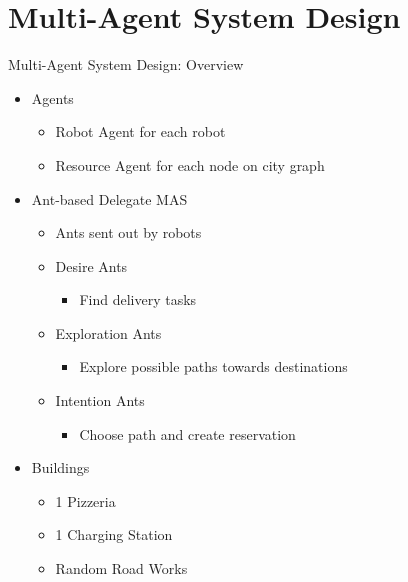 \section{Multi-Agent System Design}

\begin{frame}{Multi-Agent System Design: Overview}
    \begin{itemize}
        \item Agents
            \begin{itemize}
                \item Robot Agent for each robot
                \item Resource Agent for each node on city graph
            \end{itemize}

        \item Ant-based Delegate MAS
            \begin{itemize}
                \item Ants sent out by robots
                \item Desire Ants
                \begin{itemize}
                    \item Find delivery tasks
                \end{itemize}

                \item Exploration Ants
                \begin{itemize}
                    \item Explore possible paths towards destinations
                \end{itemize}

                \item Intention Ants
                \begin{itemize}
                    \item Choose path and create reservation
                \end{itemize}
            \end{itemize}

        \item Buildings
            \begin{itemize}
                \item 1 Pizzeria
                \item 1 Charging Station
                \item Random Road Works
            \end{itemize}
    \end{itemize}
\end{frame}

